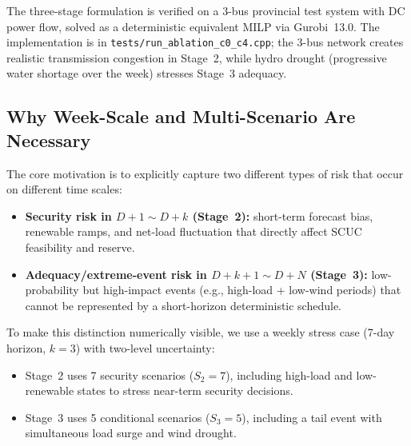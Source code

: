 \documentclass[11pt]{article}
\begin{document}
The three-stage formulation is verified on a 3-bus provincial test
system with DC power flow, solved as a deterministic equivalent MILP
via Gurobi~13.0. The implementation is in
\texttt{tests/run\_ablation\_c0\_c4.cpp}; the 3-bus network
creates realistic transmission congestion in Stage~2, while hydro
drought (progressive water shortage over the week) stresses Stage~3
adequacy.

\subsection{Why Week-Scale and Multi-Scenario Are Necessary}
\label{sec:week-necessity}

The core motivation is to explicitly capture two different types of
risk that occur on different time scales:
\begin{itemize}[nosep]
  \item \textbf{Security risk in $D{+}1\sim D{+}k$ (Stage~2):}
    short-term forecast bias, renewable ramps, and net-load
    fluctuation that directly affect SCUC feasibility and reserve.
  \item \textbf{Adequacy/extreme-event risk in $D{+}k{+}1\sim D{+}N$
    (Stage~3):}
    low-probability but high-impact events (e.g.,
    high-load + low-wind periods) that cannot be represented by
    a short-horizon deterministic schedule.
\end{itemize}

To make this distinction numerically visible, we use a weekly stress
case (7-day horizon, $k=3$) with two-level uncertainty:
\begin{itemize}[nosep]
  \item Stage~2 uses 7 security scenarios ($S_2=7$), including
    high-load and low-renewable states to stress near-term
    security decisions.
  \item Stage~3 uses 5 conditional scenarios ($S_3=5$), including a
    tail event with simultaneous load surge and wind drought.
\end{itemize}
\end{document}
